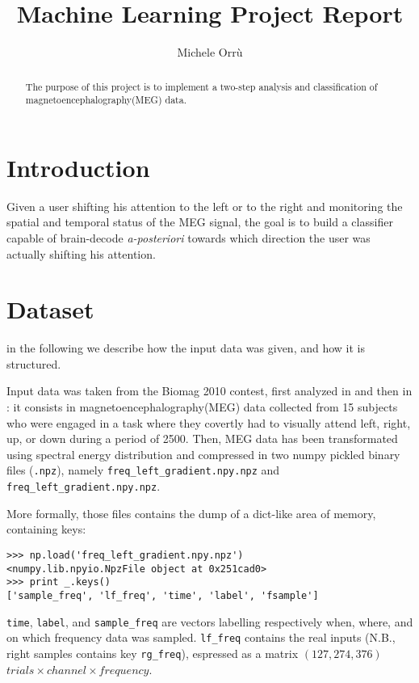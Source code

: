 \documentclass[10pt]{article}
\title{\textbf{Machine Learning Project Report }}
\author{Michele Orr\`u}
\begin{document}
\newcommand{\code}[1]{\texttt{#1}}
\maketitle
\begin{abstract}
The purpose of this project is to implement a two-step analysis and classification of magnetoencephalography(MEG) data. 
\end{abstract}



\section{Introduction}
Given a user shifting his attention to the left or to the right and monitoring the spatial and temporal status of the MEG\cite{Biomag2010} signal, the goal is to build a classifier capable of brain-decode \textit{a-posteriori} towards which direction the user was actually shifting his attention.



\section{Dataset}
in the following we describe how the input data was given, and how it is structured. 

\noindent
Input data was taken from the Biomag 2010 contest, first analyzed in 
\cite{Biomag2010} and then in \cite{Braindecoding}: it consists in
 magnetoencephalography(MEG) data collected from 15 subjects who were engaged in
a task where they covertly had to visually attend left, right, up, or down during a
period of 2500\milli\second. 
Then, MEG data has been transformated using spectral energy distribution and compressed in two numpy pickled binary files
 (\code{.npz}), namely \code{freq\_left\_gradient.npy.npz}
 and \code{freq\_left\_gradient.npy.npz}.

More formally, those files contains the dump of a dict-like area of memory, containing keys:
\begin{verbatim}
>>> np.load('freq_left_gradient.npy.npz')
<numpy.lib.npyio.NpzFile object at 0x251cad0>
>>> print _.keys()
['sample_freq', 'lf_freq', 'time', 'label', 'fsample']
\end{verbatim}

\code{time}, \code{label}, and \code{sample\_freq} are vectors labelling respectively when, where, and on which frequency data was sampled.
\code{lf\_freq} contains the real inputs (N.B., right samples contains key \code{rg\_freq}), espressed as a matrix $(127, 274, 376)$ $trials \times channel \times frequency$.
\end{document}
